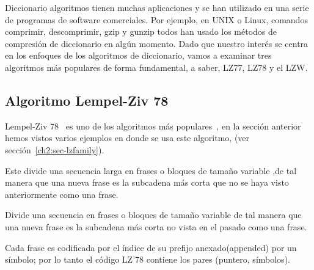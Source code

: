 Diccionario algoritmos tienen muchas aplicaciones y se han utilizado en una serie de programas de software comerciales. Por ejemplo, en UNIX o Linux, comandos comprimir, descomprimir, gzip y gunzip todos han usado los métodos de compresión de diccionario en algún momento. Dado que nuestro interés se centra en los enfoques de los algoritmos de diccionario, vamos a examinar tres algoritmos más populares de forma fundamental, a saber, LZ77, LZ78 y el LZW.


 



























\uncm
\subsection{Algoritmo Lempel-Ziv 78}










Lempel-Ziv 78~\cite{ZivLempel1978} es uno de los algoritmos \losslessdatacompression más populares~\cite{Begleiter2004}, en la sección anterior hemos vistos varios ejemplos en donde se usa este algoritmo, (ver sección~\ref{ch2:sec-lzfamily}).

Este divide una secuencia larga en frases o bloques de tamaño variable ,de tal manera que una nueva frase es la subcadena más corta que no se haya visto anteriormente como una frase.

Divide una secuencia en frases o bloques de tamaño variable de tal manera que una nueva frase es la subcadena más corta no vista en el pasado como una frase.

Cada frase es codificada por el índice de su prefijo anexado(appended) por un símbolo; por lo tanto el código LZ'78 contiene los pares (puntero, símbolos).

